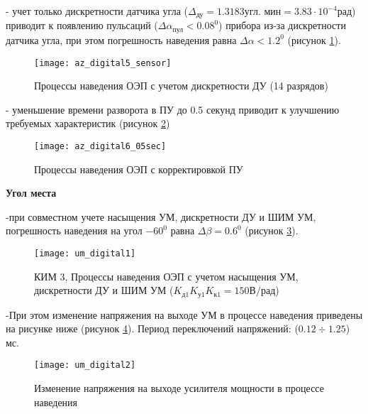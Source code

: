 - учет только дискретности датчика угла ($\varDelta_{\textit{ду}} = 1.3183 \textit{угл. мин} = 3.83 \cdot 10^{-4} \textit{рад}$) приводит к появлению пульсаций ($\varDelta\alpha_{\textit{пул}} < 0.08^0$) прибора из-за дискретности датчика угла, при этом погрешность наведения равна $\varDelta\alpha < 1.2^0$ (рисунок \ref{fig:az_digital5}).\par

\begin{figure}
	\centering
	\texttt{[image: az\_digital5\_sensor]} 
	\caption{Процессы наведения ОЭП с учетом дискретности ДУ (14 разрядов)}
	\label{fig:az_digital5}
\end{figure}
- уменьшение времени разворота в ПУ до 0.5 секунд приводит к улучшению требуемых характеристик (рисунок \ref{fig:az_digital6})

\begin{figure}
	\centering
	\texttt{[image: az\_digital6\_05sec]} 
	\caption{Процессы наведения ОЭП с корректировкой ПУ}
	\label{fig:az_digital6}
\end{figure}









\textbf{Угол места}


-при совместном учете насыщения УМ, дискретности ДУ и ШИМ УМ, погрешность наведения на угол $-60^0$ равна $\varDelta \beta = 0.6^0$ (рисунок \ref{fig:um_digital}).\par

\begin{figure}[ht]
	\centering
	\texttt{[image: um\_digital1]} 
	\caption{КИМ 3, Процессы наведения ОЭП с учетом насыщения УМ, дискретности ДУ и ШИМ УМ ($K_{\textit{д1}} K_{\textit{у1}} K_{\textit{к1}} = 150 \textit{В/рад}$)}
	\label{fig:um_digital}
\end{figure}

-При этом изменение напряжения на выходе УМ в процессе наведения приведены на рисунке ниже (рисунок \ref{fig:um_digital2}). Период переключений напряжений: ($0.12 \div 1.25$) мс.\par

\begin{figure}[ht]
	\centering
	\texttt{[image: um\_digital2]} 
	\caption{Изменение напряжения на выходе усилителя мощности в процессе наведения}
	\label{fig:um_digital2}
\end{figure}

